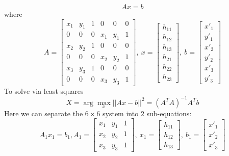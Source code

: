 \documentclass[12pt]{article}
\begin{document}
\begin{equation*}
    Ax = b
\end{equation*}
where
\begin{equation*}
A = \left[ \begin{array}{cccccc}
x_1 & y_1 & 1 & 0 & 0 & 0\\
0 & 0 & 0 & x_1 & y_1 & 1\\
x_2 & y_2 & 1 & 0 & 0 & 0\\
0 & 0 & 0 & x_2 & y_2 & 1\\
x_3 & y_3 & 1 & 0 & 0 & 0\\
0 & 0 & 0 & x_3 & y_3 & 1
\end{array} \right],\  x= \left[ \begin{array}{c}
h_{11} \\
h_{12} \\
h_{13} \\
h_{21} \\
h_{22} \\
h_{23} 
\end{array} \right],\  b= \left[ \begin{array}{c}
x'_1\\
y'_1\\
x'_2\\
y'_2\\
x'_3\\
y'_3
\end{array} \right] 
\end{equation*}
To solve via least squares 
\begin{equation*}
    X = \arg\max_{x}||Ax-b||^2 = (A^TA)^{-1}A^Tb
\end{equation*}
Here we can separate the $6\times6$ system into $2$ sub-equations:
\begin{equation*}
A_1x_1 = b_1, A_1 = \left[ \begin{array}{ccc}
x_1 & y_1 & 1\\
x_2 & y_2 & 1\\
x_3 & y_3 & 1
\end{array} \right],\  x_1= \left[ \begin{array}{c}
h_{11} \\
h_{12} \\
h_{13}
\end{array} \right],\  b_1= \left[ \begin{array}{c}
x'_1\\
x'_2\\
x'_3
\end{array} \right] 
\end{equation*}
\end{document}
